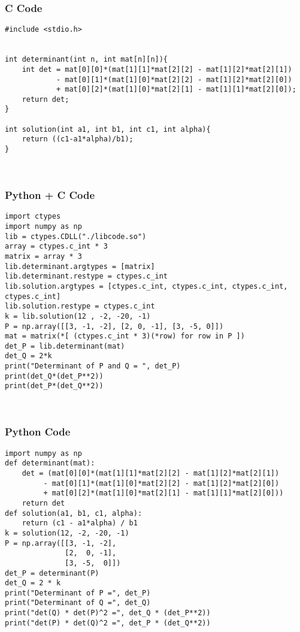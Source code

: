 \documentclass{beamer}
\begin{document}
\begin{frame}[fragile]
    \frametitle{C Code}
    \begin{lstlisting}
#include <stdio.h>


int determinant(int n, int mat[n][n]){
    int det = mat[0][0]*(mat[1][1]*mat[2][2] - mat[1][2]*mat[2][1])
            - mat[0][1]*(mat[1][0]*mat[2][2] - mat[1][2]*mat[2][0])
            + mat[0][2]*(mat[1][0]*mat[2][1] - mat[1][1]*mat[2][0]);
    return det;
}

int solution(int a1, int b1, int c1, int alpha){
    return ((c1-a1*alpha)/b1);
}



    \end{lstlisting}
\end{frame}
\begin{frame}[fragile]
    \frametitle{Python + C Code}
    \begin{lstlisting}
import ctypes
import numpy as np 
lib = ctypes.CDLL("./libcode.so")
array = ctypes.c_int * 3
matrix = array * 3
lib.determinant.argtypes = [matrix]
lib.determinant.restype = ctypes.c_int
lib.solution.argtypes = [ctypes.c_int, ctypes.c_int, ctypes.c_int, ctypes.c_int]
lib.solution.restype = ctypes.c_int
k = lib.solution(12 , -2, -20, -1)
P = np.array([[3, -1, -2], [2, 0, -1], [3, -5, 0]])
mat = matrix(*[ (ctypes.c_int * 3)(*row) for row in P ])
det_P = lib.determinant(mat)
det_Q = 2*k 
print("Determinant of P and Q = ", det_P)
print(det_Q*(det_P**2))
print(det_P*(det_Q**2))



    \end{lstlisting}
\end{frame}

\begin{frame}[fragile]
    \frametitle{Python Code}
    \begin{lstlisting}
import numpy as np
def determinant(mat):
    det = (mat[0][0]*(mat[1][1]*mat[2][2] - mat[1][2]*mat[2][1])
         - mat[0][1]*(mat[1][0]*mat[2][2] - mat[1][2]*mat[2][0])
         + mat[0][2]*(mat[1][0]*mat[2][1] - mat[1][1]*mat[2][0]))
    return det
def solution(a1, b1, c1, alpha):
    return (c1 - a1*alpha) / b1
k = solution(12, -2, -20, -1)
P = np.array([[3, -1, -2],
              [2,  0, -1],
              [3, -5,  0]])
det_P = determinant(P)
det_Q = 2 * k
print("Determinant of P =", det_P)
print("Determinant of Q =", det_Q)
print("det(Q) * det(P)^2 =", det_Q * (det_P**2))
print("det(P) * det(Q)^2 =", det_P * (det_Q**2))




    \end{lstlisting}
\end{frame}
\end{document}
